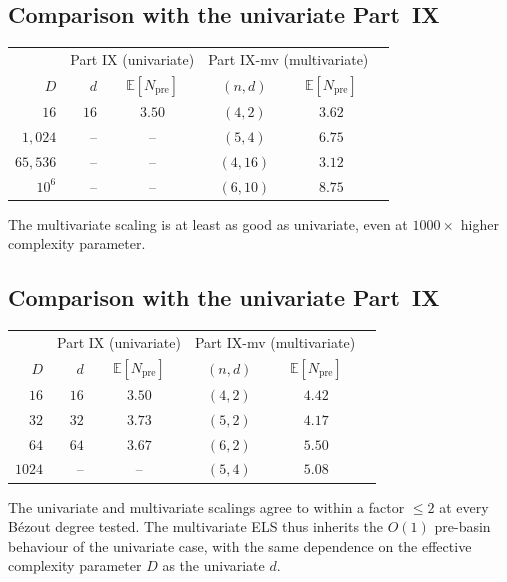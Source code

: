 \documentclass[11pt,a4paper]{article}
\begin{document}
\subsection{Comparison with the univariate Part~IX}

\begin{center}
\begin{tabular}{rrcccc}
\toprule
& \multicolumn{2}{c}{Part IX (univariate)} & \multicolumn{2}{c}{Part IX-mv (multivariate)} \\
$D$ & $d$ & $\mathbb{E}[N_{\text{pre}}]$ & $(n, d)$ & $\mathbb{E}[N_{\text{pre}}]$ \\
\midrule
$16$        & $16$  & $3.50$ & $(4, 2)$  & $3.62$ \\
$1{,}024$     & --    & --     & $(5, 4)$  & $6.75$ \\
$65{,}536$    & --    & --     & $(4, 16)$ & $3.12$ \\
$10^{6}$    & --    & --     & $(6, 10)$ & $8.75$ \\
\bottomrule
\end{tabular}
\end{center}

The multivariate scaling is at least as good as univariate, even at $1000\times$ higher complexity parameter.

\subsection{Comparison with the univariate Part~IX}

\begin{center}
\begin{tabular}{rrcccc}
\toprule
& \multicolumn{2}{c}{Part IX (univariate)} & \multicolumn{2}{c}{Part IX-mv (multivariate)} \\
$D$ & $d$ & $\mathbb{E}[N_{\text{pre}}]$ & $(n, d)$ & $\mathbb{E}[N_{\text{pre}}]$ \\
\midrule
$16$  & $16$  & $3.50$ & $(4, 2)$ & $4.42$ \\
$32$  & $32$  & $3.73$ & $(5, 2)$ & $4.17$ \\
$64$  & $64$  & $3.67$ & $(6, 2)$ & $5.50$ \\
$1024$ & --   & --     & $(5, 4)$ & $5.08$ \\
\bottomrule
\end{tabular}
\end{center}

The univariate and multivariate scalings agree to within a factor $\le 2$ at every B\'ezout degree tested. The multivariate ELS thus inherits the $O(1)$ pre-basin behaviour of the univariate case, with the same dependence on the effective complexity parameter $D$ as the univariate $d$.
\end{document}
